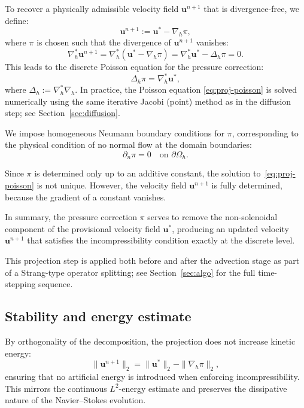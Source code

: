\documentclass[11pt]{article}
\begin{document}
To recover a physically admissible velocity field $\bm{u}^{n+1}$ that is divergence-free, we define:
\[
   \bm{u}^{n+1} := \bm{u}^\ast - \nabla_h \pi,
\]
where $\pi$ is chosen such that the divergence of $\bm{u}^{n+1}$ vanishes:
\[
   \nabla_h^{*} \bm{u}^{n+1}
   = \nabla_h^{*}(\bm{u}^\ast - \nabla_h \pi)
   = \nabla_h^{*} \bm{u}^\ast - \Delta_h \pi
   = 0.
\]
This leads to the discrete Poisson equation for the pressure correction:
\begin{equation}\label{eq:proj-poisson}
   \Delta_h \pi = \nabla_h^{*} \bm{u}^\ast,
\end{equation}
where $\Delta_h := \nabla_h^{*} \nabla_h$. In practice, the Poisson equation \eqref{eq:proj-poisson} is solved numerically using the same iterative Jacobi (point) method as in the diffusion step; see Section~\ref{sec:diffusion}.


We impose homogeneous Neumann boundary conditions for $\pi$, corresponding to the physical condition of no normal flow at the domain boundaries:
\[
\partial_n \pi = 0 \quad \text{on } \partial \Omega_h.
\]

Since $\pi$ is determined only up to an additive constant, the solution to~\eqref{eq:proj-poisson} is not unique. However, the velocity field $\bm{u}^{n+1}$ is fully determined, because the gradient of a constant vanishes.

\medskip

In summary, the pressure correction $\pi$ serves to remove the non-solenoidal component of the provisional velocity field $\bm{u}^\ast$, producing an updated velocity $\bm{u}^{n+1}$ that satisfies the incompressibility condition exactly at the discrete level.


This projection step is applied both before and after the advection stage as part of a Strang-type operator splitting; see Section~\ref{sec:algo} for the full time-stepping sequence.



\subsection*{Stability and energy estimate}

By orthogonality of the decomposition, the projection does not increase
kinetic energy:
\[
   \|\bm{u}^{n+1}\|_2 = \|\bm{u}^\ast\|_2 - \|\nabla_h \pi\|_2,
\]
ensuring that no artificial energy is introduced when enforcing
incompressibility. This mirrors the continuous \(L^2\)-energy estimate
and preserves the dissipative nature of the Navier–Stokes evolution.
\end{document}
